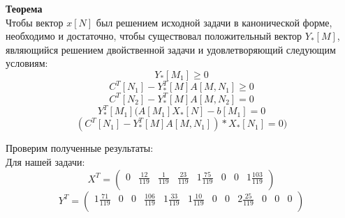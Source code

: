 \documentclass[../body.tex]{subfiles}
\begin{document}
	\textbf{Теорема}\\
	Чтобы вектор $x[N]$ был решением исходной задачи в канонической форме, необходимо и достаточно, чтобы существовал положительный вектор $Y_{*}[M]$, являющийся решением двойственной задачи и удовлетворяющий следующим условиям:
	\begin{equation}\label{eq:first}
		Y_{*}[M_1]\ge 0
	\end{equation}
	\begin{equation}\label{eq:second}
		C^{T}[N_1]-Y^{T}_{*}[M]A[M,N_1]\ge 0
	\end{equation}
	\begin{equation}\label{eq:third}
		C^{T}[N_2]-Y^{T}_{*}[M]A[M,N_2] = 0
	\end{equation}
	\begin{equation}\label{eq:fourth}
		Y^{T}_{*}[M_1](A[M_1]X_{*}[N]-b[M_1] = 0
	\end{equation}
	\begin{equation}\label{eq:fifth}
		(C^{T}[N_1]-Y^{T}_{*}[M]A[M,N_1])*X_{*}[N_1] = 0)
	\end{equation}

	Проверим полученные результаты:\\
	
	Для нашей задачи:\\
    $$X^T =  \begin{pmatrix} 	0 & \frac{12}{119} & \frac{1}{119} & \frac{23}{119} & 1\frac{75}{119} & 0 & 0 & 1\frac{103}{119} \\  \end{pmatrix}$$
	\setcounter{MaxMatrixCols}{20}
	$$Y^T =  \begin{pmatrix}	1\frac{71}{119} & 0 & 0 & \frac{106}{119} & 1\frac{33}{119} & 1\frac{10}{119} & 0 & 0 & 2\frac{25}{119} & 0 & 0 & 0\\ \end{pmatrix}$$
	\vspace{\baselineskip}
	
\end{document}
